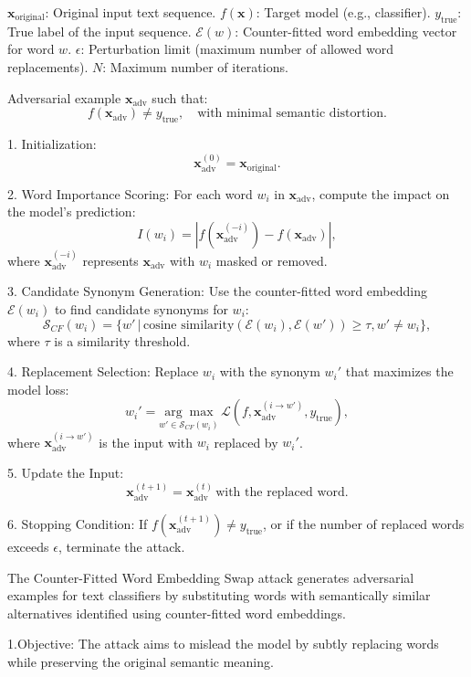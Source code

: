$\mathbf{x}_{\text{original}}$: Original input text sequence.  
$f(\mathbf{x})$: Target model (e.g., classifier).  
$y_{\text{true}}$: True label of the input sequence.  
$\mathcal{E}(w)$: Counter-fitted word embedding vector for word $w$.  
$\epsilon$: Perturbation limit (maximum number of allowed word replacements).  
$N$: Maximum number of iterations.  

Adversarial example $\mathbf{x}_{\text{adv}}$ such that:  
\[
f(\mathbf{x}_{\text{adv}}) \neq y_{\text{true}}, \quad \text{with minimal semantic distortion}.
\]

1. Initialization:  
   \[
   \mathbf{x}_{\text{adv}}^{(0)} = \mathbf{x}_{\text{original}}.
   \]

2. Word Importance Scoring: For each word $w_i$ in $\mathbf{x}_{\text{adv}}$, compute the impact on the model's prediction:  
     \[
     I(w_i) = |f(\mathbf{x}_{\text{adv}}^{(-i)}) - f(\mathbf{x}_{\text{adv}})|,
     \]  
     where $\mathbf{x}_{\text{adv}}^{(-i)}$ represents $\mathbf{x}_{\text{adv}}$ with $w_i$ masked or removed.

3. Candidate Synonym Generation: Use the counter-fitted word embedding $\mathcal{E}(w_i)$ to find candidate synonyms for $w_i$:  
     \[
     \mathcal{S}_{CF}(w_i) = \{w' \,|\, \text{cosine similarity}(\mathcal{E}(w_i), \mathcal{E}(w')) \geq \tau, w' \neq w_i\},
     \]  
     where $\tau$ is a similarity threshold.

4. Replacement Selection: Replace $w_i$ with the synonym $w_i'$ that maximizes the model loss:  
     \[
     w_i' = \underset{w' \in \mathcal{S}_{CF}(w_i)}{\arg \max} \, \mathcal{L}(f, \mathbf{x}_{\text{adv}}^{(i \rightarrow w')}, y_{\text{true}}),
     \]  
     where $\mathbf{x}_{\text{adv}}^{(i \rightarrow w')}$ is the input with $w_i$ replaced by $w_i'$.

5. Update the Input:  
   \[
   \mathbf{x}_{\text{adv}}^{(t+1)} = \mathbf{x}_{\text{adv}}^{(t)} \, \text{with the replaced word}.
   \]

6. Stopping Condition: If $f(\mathbf{x}_{\text{adv}}^{(t+1)}) \neq y_{\text{true}}$, or if the number of replaced words exceeds $\epsilon$, terminate the attack.

The Counter-Fitted Word Embedding Swap attack generates adversarial examples for text classifiers by substituting words with semantically similar alternatives identified using counter-fitted word embeddings.

1.Objective: The attack aims to mislead the model by subtly replacing words while preserving the original semantic meaning.  

